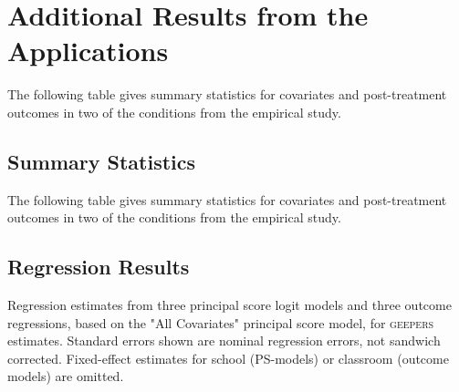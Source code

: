 \documentclass[]{article}
\begin{document}
\section{Additional Results from the Applications}
\singlespacing
The following table gives summary statistics for covariates and post-treatment outcomes in two of the conditions from the empirical study.\\


\subsection{Summary Statistics}
The following table gives summary statistics for covariates and post-treatment outcomes in two of the conditions from the empirical study.\\
\small

\clearpage

\small


\subsection{Regression Results}
Regression estimates from three principal score logit models and three outcome regressions, based on the "All Covariates" principal score model, for \textsc{geepers} estimates. Standard errors shown are nominal regression errors, not sandwich corrected. Fixed-effect estimates for school (PS-models) or classroom (outcome models) are omitted.

\small
%




\end{document}
